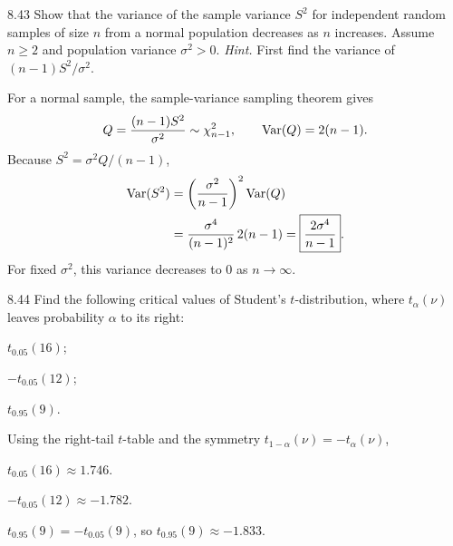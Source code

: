 \documentclass[11pt,oneside]{article}
\begin{document}
\begin{exercise}{8.43}
Show that the variance of the sample variance $S^2$ for independent random samples of size $n$ from a normal population decreases as $n$ increases. Assume $n\ge2$ and population variance $\sigma^2>0$. \textit{Hint.} First find the variance of $(n-1)S^2/\sigma^2$.
\end{exercise}
\begin{solution}
For a normal sample, the sample-variance sampling theorem gives
\[
Q=\frac{(n-1)S^2}{\sigma^2}\sim\chi^2_{n-1},
\qquad \operatorname{Var}(Q)=2(n-1).
\]
Because $S^2=\sigma^2Q/(n-1)$,
\[
\begin{aligned}
\operatorname{Var}(S^2)
&=\left(\frac{\sigma^2}{n-1}\right)^2\operatorname{Var}(Q)\\
&=\frac{\sigma^4}{(n-1)^2}\,2(n-1)
=\boxed{\frac{2\sigma^4}{n-1}}.
\end{aligned}
\]
For fixed $\sigma^2$, this variance decreases to $0$ as $n\to\infty$.
\end{solution}

\begin{exercise}{8.44}
Find the following critical values of Student's $t$-distribution, where $t_\alpha(\nu)$ leaves probability $\alpha$ to its right:
\begin{exercisesubparts}
\item $t_{0.05}(16)$;
\item $-t_{0.05}(12)$;
\item $t_{0.95}(9)$.
\end{exercisesubparts}
\end{exercise}
\begin{solution}
Using the right-tail $t$-table and the symmetry $t_{1-\alpha}(\nu)=-t_\alpha(\nu)$,
\begin{exercisesubparts}
\item $\boxed{t_{0.05}(16)\approx1.746}$.
\item $\boxed{-t_{0.05}(12)\approx-1.782}$.
\item $t_{0.95}(9)=-t_{0.05}(9)$, so $\boxed{t_{0.95}(9)\approx-1.833}$.
\end{exercisesubparts}
\end{solution}
\end{document}
